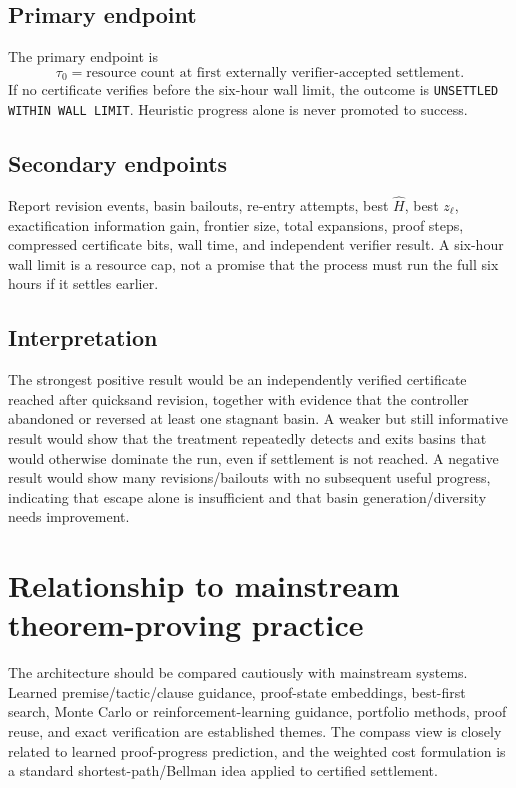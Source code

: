 \documentclass[11pt]{article}
\newcommand{\Hhat}{\widehat H}
\begin{document}
\subsection{Primary endpoint}

The primary endpoint is
\[
\tau_0=\text{resource count at first externally verifier-accepted settlement}.
\]
If no certificate verifies before the six-hour wall limit, the outcome is \texttt{UNSETTLED WITHIN WALL LIMIT}. Heuristic progress alone is never promoted to success.

\subsection{Secondary endpoints}

Report revision events, basin bailouts, re-entry attempts, best $\Hhat$, best $z_\ell$, exactification information gain, frontier size, total expansions, proof steps, compressed certificate bits, wall time, and independent verifier result. A six-hour wall limit is a resource cap, not a promise that the process must run the full six hours if it settles earlier.

\subsection{Interpretation}

The strongest positive result would be an independently verified certificate reached after quicksand revision, together with evidence that the controller abandoned or reversed at least one stagnant basin. A weaker but still informative result would show that the treatment repeatedly detects and exits basins that would otherwise dominate the run, even if settlement is not reached. A negative result would show many revisions/bailouts with no subsequent useful progress, indicating that escape alone is insufficient and that basin generation/diversity needs improvement.

\section{Relationship to mainstream theorem-proving practice}

The architecture should be compared cautiously with mainstream systems. Learned premise/tactic/clause guidance, proof-state embeddings, best-first search, Monte Carlo or reinforcement-learning guidance, portfolio methods, proof reuse, and exact verification are established themes. The compass view is closely related to learned proof-progress prediction, and the weighted cost formulation is a standard shortest-path/Bellman idea applied to certified settlement.
\end{document}
